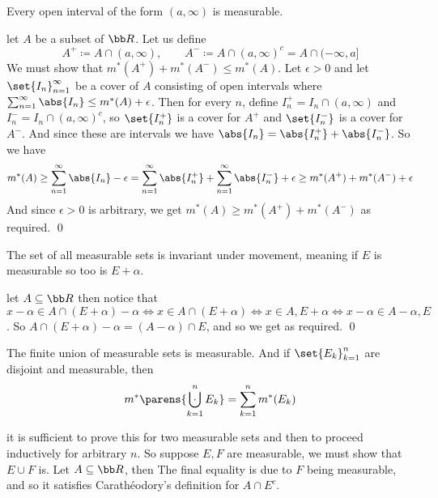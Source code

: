 \bthrm

    Every open interval of the form $(a,\infty)$ is measurable.

\ethrm

\Proof let $A$ be a subset of ${\bb R}$.
Let us define
$$ A^+ \coloneqq A\cap(a,\infty),\qquad A^- \coloneqq A\cap(a,\infty)^c = A\cap(-\infty,a] $$
We must show that $m^*(A^+)+m^*(A^-)\leq m^*(A)$.
Let $\epsilon>0$ and let $\set{I_n}_{n=1}^\infty$ be a cover of $A$ consisting of open intervals where $\sum_{n=1}^\infty\abs{I_n}\leq m^*(A)+\epsilon$.
Then for every $n$, define $I_n^+=I_n\cap(a,\infty)$ and $I_n^-=I_n\cap(a,\infty)^c$, so $\set{I_n^+}$ is a cover for $A^+$ and $\set{I_n^-}$ is a cover for $A^-$.
And since these are intervals we have $\abs{I_n}=\abs{I_n^+}+\abs{I_n^-}$.
So we have
$$ m^*(A) \geq \sum_{n=1}^\infty\abs{I_n}-\epsilon = \sum_{n=1}^\infty\abs{I_n^+} + \sum_{n=1}^\infty\abs{I_n^-} + \epsilon \geq m^*(A^+) + m^*(A^-) + \epsilon $$
And since $\epsilon>0$ is arbitrary, we get $m^*(A)\geq m^*(A^+)+m^*(A^-)$ as required.
\qed

\bprop

    The set of all measurable sets is invariant under movement, meaning if $E$ is measurable so too is $E+\alpha$.

\eprop

\Proof let $A\subseteq{\bb R}$ then notice that $x-\alpha\in A\cap(E+\alpha)-\alpha\iff x\in A\cap(E+\alpha)\iff x\in A,E+\alpha\iff x-\alpha\in A-\alpha,E$.
So $A\cap(E+\alpha)-\alpha=(A-\alpha)\cap E$, and so we get
as required.
\qed

\blemm

    The finite union of measurable sets is measurable.
    And if $\set{E_k}_{k=1}^n$ are disjoint and measurable, then
    $$ m^*\parens{\bigdcup_{k=1}^nE_k} = \sum_{k=1}^n m^*(E_k) $$

\elemm

\Proof it is sufficient to prove this for two measurable sets and then to proceed inductively for arbitrary $n$.
So suppose $E,F$ are measurable, we must show that $E\cup F$ is.
Let $A\subseteq{\bb R}$, then
The final equality is due to $F$ being measurable, and so it satisfies Carath\'eodory's definition for $A\cap E^c$.

